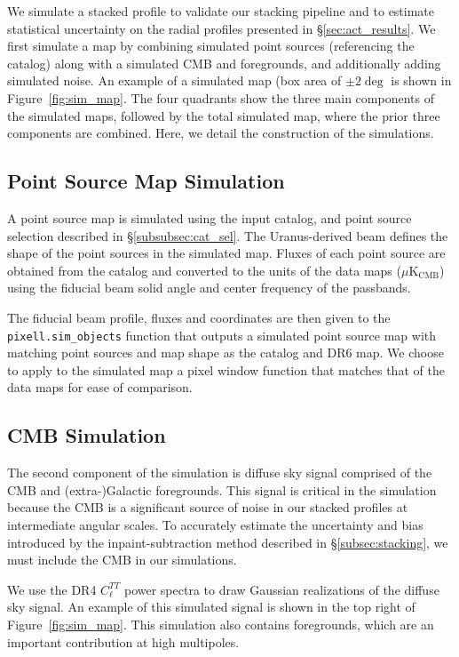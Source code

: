 We simulate a stacked profile to validate our stacking pipeline and to estimate statistical uncertainty on the radial profiles presented in \S\ref{sec:act_results}.  We first simulate a map by combining simulated point sources (referencing the catalog) along with a simulated CMB and foregrounds, and additionally adding simulated noise.  An example of a simulated map (box area of $\pm2\deg$ is shown in Figure~\ref{fig:sim_map}.  The four quadrants show the three main components of the simulated maps, followed by the total simulated map, where the prior three components are combined.  Here, we detail the construction of the simulations.

\subsection{Point Source Map Simulation}
\label{subsec:sim_ptsrc}
A point source map is simulated using the input catalog, and point source selection described in \S\ref{subsubsec:cat_sel}.  The Uranus-derived beam defines the shape of the point sources in the simulated map.  Fluxes of each point source are obtained from the catalog and converted to the units of the data maps ($\mu \text{K}_\text{CMB}$) using the fiducial beam solid angle and center frequency of the passbands.

The fiducial beam profile, fluxes and coordinates are then given to the \verb|pixell.sim_objects| function that outputs a simulated point source map with matching point sources and map shape as the catalog and DR6 map. We choose to apply to the simulated map a pixel window function that matches that of the data maps for ease of comparison.

\subsection{CMB Simulation}
\label{subsec:sim_cmb}
The second component of the simulation is diffuse sky signal comprised of the CMB and (extra-)Galactic foregrounds.  This signal is critical in the simulation because the CMB is a significant source of noise in our stacked profiles at intermediate angular scales.  To accurately estimate the uncertainty and bias introduced by the inpaint-subtraction method described in \S\ref{subsec:stacking}, we must include the CMB in our simulations.

We use the DR4 $C_\ell^{TT}$ power spectra to draw Gaussian realizations of the diffuse sky signal. An example of this simulated signal is shown in the top right of Figure~\ref{fig:sim_map}.  This simulation also contains foregrounds, which are an important contribution at high multipoles.

